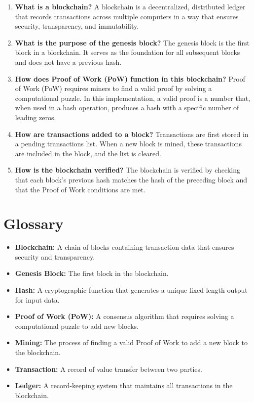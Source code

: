 \documentclass[11pt]{article}
\begin{document}
\begin{enumerate}
    \item \textbf{What is a blockchain?}  
    A blockchain is a decentralized, distributed ledger that records transactions across multiple computers in a way that ensures security, transparency, and immutability.

    \item \textbf{What is the purpose of the genesis block?}  
    The genesis block is the first block in a blockchain. It serves as the foundation for all subsequent blocks and does not have a previous hash.

    \item \textbf{How does Proof of Work (PoW) function in this blockchain?}  
    Proof of Work (PoW) requires miners to find a valid proof by solving a computational puzzle. In this implementation, a valid proof is a number that, when used in a hash operation, produces a hash with a specific number of leading zeros.

    \item \textbf{How are transactions added to a block?}  
    Transactions are first stored in a pending transactions list. When a new block is mined, these transactions are included in the block, and the list is cleared.

    \item \textbf{How is the blockchain verified?}  
    The blockchain is verified by checking that each block's previous hash matches the hash of the preceding block and that the Proof of Work conditions are met.

\end{enumerate}

\section{Glossary}

\begin{itemize}
    \item \textbf{Blockchain:} A chain of blocks containing transaction data that ensures security and transparency.
    \item \textbf{Genesis Block:} The first block in the blockchain.
    \item \textbf{Hash:} A cryptographic function that generates a unique fixed-length output for input data.
    \item \textbf{Proof of Work (PoW):} A consensus algorithm that requires solving a computational puzzle to add new blocks.
    \item \textbf{Mining:} The process of finding a valid Proof of Work to add a new block to the blockchain.
    \item \textbf{Transaction:} A record of value transfer between two parties.
    \item \textbf{Ledger:} A record-keeping system that maintains all transactions in the blockchain.
\end{itemize}
\end{document}
